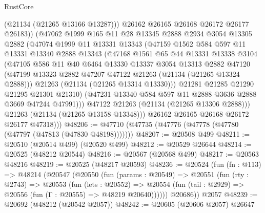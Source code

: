 \begin{lexlean}{RustCore}
\begin{coremodule}
                  (@21134 (@21265 @13166 @13287)))
                @26162
                @26165
                @26168
                @26172
                @26177
                @26183))
            (@47062
              @1999
              @165
              @11
              @28
              @13345
              @2888
              @2934
              @3054
              @13305
              @2882
              (@47074
                @1999
                @11
                @13331
                @13343
                (@47159
                  @1562
                  @584
                  @597
                  @11
                  @13331
                  @13340
                  @2888
                  @13343
                  (@47168
                    @1561
                    @65
                    @44
                    @13331
                    @13338
                    @3104
                    (@47105
                      @586
                      @11
                      @40
                      @6464
                      @13330
                      @13337
                      @3054
                      @13313
                      @2882
                      @47120
                      (@47199 @13323 @2882 @47207 @47122 @21263 (@21134 (@21265 @13324 @2888)))
                      @21263
                      (@21134 (@21265 @13314 @13330)))
                    @21281
                    @21285
                    @21290
                    @21295
                    @21301
                    @21310)
                  (@47231 @13340 @584 @597 @11 @2888 @3636 @2888 @3669 @47244 @47991)))
              @47122
              @21263
              (@21134 (@21265 @13306 @2888)))
            @21263
            (@21134 (@21265 @13158 @13348)))
          @26162
          @26165
          @26168
          @26172
          @26177
          @47318)))
@48206 := @47710 (@47735 (@47776 (@47778 (@47780 (@47797 (@47813 (@47830 @48198)))))))
@48207 := @20508 @499
@48211 := @20510 (@20514 @499) (@20520 @499)
@48212 := @20529 @26644
@48214 := @20525 (@48212 @20544)
@48216 := @20567 (@20568 @499)
@48217 := @20563 @48216
@48219 := @20525 (@48217 @20593)
@48236 := @20524
    (fun (fn : @113) =>
    @48214
      (@20547
        (@20550
          (fun (params : @20549) =>
          @20551
            (fun (rty : @2743) =>
            @20553
              (fun (lets : @20552) =>
              @20554 (fun (tail : @2929) => @20556 (fun (Γ : @20555) => @48219 @20640))))))
        @20686))
    @2057
@48239 := @20692 (@48212 (@20542 @2057))
@48242 := @20605 (@20606 @2057) @26647

\end{coremodule}
\end{lexlean}
